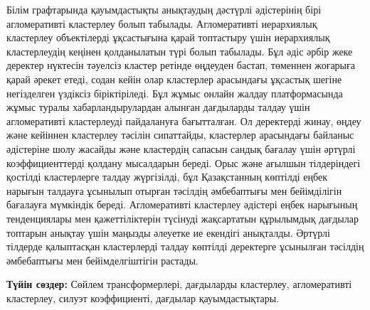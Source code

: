 Білім графтарында қауымдастықты анықтаудың дәстүрлі әдістерінің бірі
агломеративті кластерлеу болып табылады. Агломеративті иерархиялық
кластерлеу объектілерді ұқсастығына қарай топтастыру үшін иерархиялық
кластерлеудің кеңінен қолданылатын түрі болып табылады. Бұл әдіс әрбір
жеке деректер нүктесін тәуелсіз кластер ретінде өңдеуден бастап,
төменнен жоғарыға қарай әрекет етеді, содан кейін олар кластерлер
арасындағы ұқсастық шегіне негізделген үздіксіз біріктіріледі. Бұл жұмыс
онлайн жалдау платформасында жұмыс туралы хабарландырулардан алынған
дағдыларды талдау үшін агломеративті кластерлеуді пайдалануға
бағытталған. Ол деректерді жинау, өңдеу және кейіннен кластерлеу тәсілін
сипаттайды, кластерлер арасындағы байланыс әдістеріне шолу жасайды және
кластердің сапасын сандық бағалау үшін әртүрлі коэффициенттерді қолдану
мысалдарын береді. Орыс және ағылшын тілдеріндегі қостілді кластерлерге
талдау жүргізілді, бұл Қазақстанның көптілді еңбек нарығын талдауға
ұсынылып отырған тәсілдің әмбебаптығы мен бейімділігін бағалауға
мүмкіндік береді. Агломеративті кластерлеу әдістері еңбек нарығының
тенденциялары мен қажеттіліктерін түсінуді жақсартатын құрылымдық
дағдылар топтарын анықтау үшін маңызды әлеуетке ие екендігі анықталды.
Әртүрлі тілдерде қалыптасқан кластерлерді талдау көптілді деректерге
ұсынылған тәсілдің әмбебаптығы мен бейімделгіштігін растады.

{\bfseries Түйін сөздер:} Сөйлем трансформерлері, дағдыларды кластерлеу,
агломеративті кластерлеу, силуэт коэффициенті, дағдылар қауымдастықтары.

